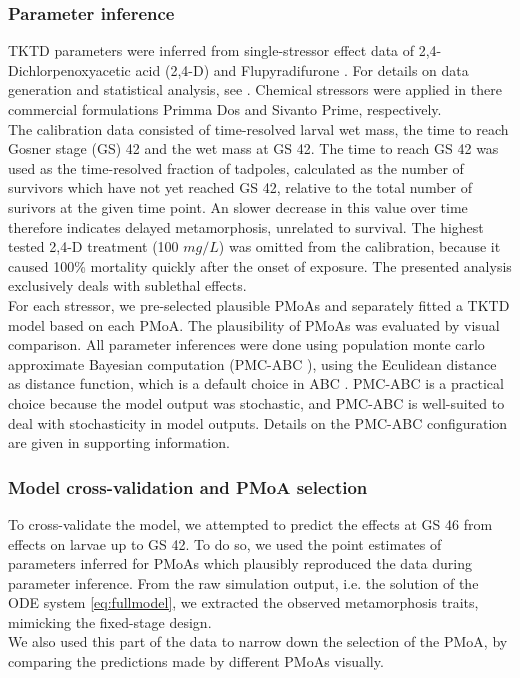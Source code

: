 \documentclass[preprint,12pt]{elsarticle}
\begin{document}
\subsubsection{Parameter inference}
%
TKTD parameters were inferred from single-stressor effect data of 2,4-Dichlorpenoxyacetic acid (2,4-D) and Flupyradifurone \citep{gonzalez-lopezChronicExposurePesticides2026}.
For details on data generation and statistical analysis, see \citet{gonzalez-lopezChronicExposurePesticides2026}. 
Chemical stressors were applied in there commercial formulations Primma \textregistered Dos and Sivanto \textregistered Prime, respectively.  \\ 
The calibration data consisted of time-resolved larval wet mass, 
the time to reach Gosner stage (GS) 42 and the wet mass at GS 42. 
The time to reach GS 42 was used as the time-resolved fraction 
of tadpoles, calculated as the number of survivors which have not yet reached GS 42, 
relative to the total number of surivors at the given time point.
An slower decrease in this value over time therefore indicates delayed metamorphosis, 
unrelated to survival.  
The highest tested 2,4-D treatment (100 $mg/L$) was omitted from the calibration, 
because it caused 100\% mortality quickly after the onset of exposure. 
The presented analysis exclusively deals with sublethal effects.\\
% 
For each stressor, we pre-selected plausible PMoAs and separately fitted a TKTD model based on each PMoA. 
The plausibility of PMoAs was evaluated by visual comparison.
%
All parameter inferences were done using population monte carlo approximate Bayesian computation 
(PMC-ABC \citep{beaumontAdaptiveApproximateBayesian2009}), 
using the Eculidean distance as distance function, which is a default choice in ABC \citep{prangleAdaptingABCDistance2017}. 
PMC-ABC is a practical choice because the model output was stochastic, 
and PMC-ABC is well-suited to deal with stochasticity in model outputs. 
Details on the PMC-ABC configuration are given in supporting information.\\
%
\subsubsection{Model cross-validation and PMoA selection}
%
To cross-validate the model, we attempted to predict the effects at GS 46 from effects on larvae up to GS 42. 
To do so, we used the point estimates of parameters inferred for PMoAs which plausibly reproduced the data during parameter inference. 
From the raw simulation output, i.e. the solution of the ODE system \ref{eq:fullmodel}, 
we extracted the observed metamorphosis traits, mimicking the fixed-stage design. \\ 
We also used this part of the data to narrow down the selection of the PMoA, 
by comparing the predictions made by different PMoAs visually. 
\end{document}
